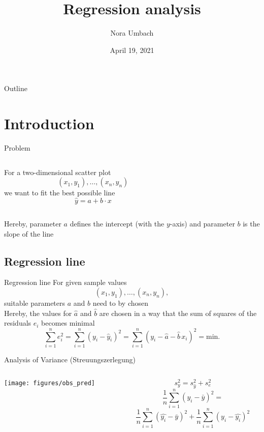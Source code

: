 \documentclass{beamer}
\title{Regression analysis}
\author{Nora Umbach%
}
\date{April 19, 2021}
\begin{document}
\begin{frame}{}
\thispagestyle{empty}
\titlepage
\end{frame}

\begin{frame}{Outline}
\tableofcontents
\end{frame}


\section[Intro]{Introduction}


\begin{frame}{Problem}
\begin{columns}
\begin{column}{5cm}
For a two-dimensional scatter plot
\[
  (x_1, y_1), \ldots, (x_n, y_n)
\]
we want to fit the best possible line
\[
  \hat{y} = a + b \cdot x
\]
\end{column}
%
\begin{column}{6cm}

\end{column}
\end{columns}

Hereby, parameter $a$ defines the intercept (with the $y$-axis) and
parameter $b$ is the slope of the line
\end{frame}

\subsection{Regression line}

\begin{frame}{Regression line}
For given sample values
\[
  (x_1, y_1), \ldots, (x_n, y_n),
\]
suitable parameters $a$ and $b$ need to by chosen\\[2ex]

Hereby, the values for $\hat{a}$ and $\hat{b}$ are chosen in a way that the
sum of squares of the residuals $e_i$ becomes minimal
\[
    \sum_{i=1}^n e_i^2
    = \sum_{i=1}^n (y_i - \hat{y}_i)^2
    = \sum_{i=1}^n (y_i - \hat{a} - \hat{b} \, x_i)^2
    = \text{min.}
\]
\end{frame}

\begin{frame}{Analysis of Variance (Streuungszerlegung)}
\begin{columns}[c]
\begin{column}{6cm}
  \texttt{[image: figures/obs\_pred]}
\end{column}
%
\begin{column}{5cm}
{\small
\[
  s_y^2 = s_{\hat y}^2 + s_e^2
\]
\[
  \frac{1}{n} \sum_{i=1}^n (y_i - \bar{y})^2 =
\]
\[
  \frac{1}{n} \sum_{i=1}^n (\hat{y_i} - \bar{y})^2 +
  \frac{1}{n} \sum_{i=1}^n (y_i - \hat{y_i})^2
\]
}
\end{column}
\end{columns}
\vfill
\end{frame}
\end{document}
